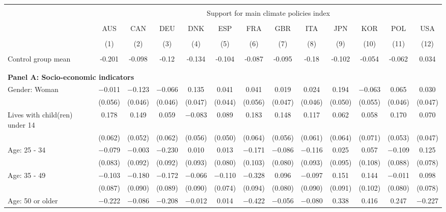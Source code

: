 
\begin{tabular}{@{\extracolsep{5pt}}lcccccccccccc} 
\\[-1.8ex]\hline 
\hline \\[-1.8ex] 
 & \multicolumn{12}{c}{Support for main climate policies index} \\ 
\cline{2-13} 
\\[-1.8ex] & AUS & CAN & DEU & DNK & ESP & FRA & GBR & ITA & JPN & KOR & POL & USA \\ 
\\[-1.8ex] & (1) & (2) & (3) & (4) & (5) & (6) & (7) & (8) & (9) & (10) & (11) & (12)\\ 
\hline \\[-1.8ex] 
Control group mean & -0.201 & -0.098 & -0.12 & -0.134 & -0.104 & -0.087 & -0.095 & -0.18 & -0.102 & -0.054 & -0.062 & 0.034   \\ \hline \\[-1.8ex]
\\[1ex]
\multicolumn{ 13 }{l}{\textbf{ Panel A: Socio-economic indicators }} \\
 Gender: Woman & $-$0.011 & $-$0.123 & $-$0.066 & 0.135 & 0.041 & 0.041 & 0.019 & 0.024 & 0.194 & $-$0.063 & 0.065 & 0.030 \\ 
  & (0.056) & (0.046) & (0.046) & (0.047) & (0.044) & (0.056) & (0.047) & (0.046) & (0.050) & (0.055) & (0.046) & (0.047) \\ 
  Lives with child(ren) under 14 & 0.178 & 0.149 & 0.059 & $-$0.083 & 0.089 & 0.183 & 0.148 & 0.117 & 0.062 & 0.058 & 0.170 & 0.070 \\ 
  & (0.062) & (0.052) & (0.062) & (0.056) & (0.050) & (0.064) & (0.056) & (0.061) & (0.064) & (0.071) & (0.053) & (0.047) \\ 
  Age: 25 - 34 & $-$0.079 & $-$0.003 & $-$0.230 & 0.010 & 0.013 & $-$0.171 & $-$0.086 & $-$0.116 & 0.025 & 0.057 & $-$0.109 & 0.125 \\ 
  & (0.083) & (0.092) & (0.092) & (0.093) & (0.080) & (0.103) & (0.080) & (0.093) & (0.095) & (0.108) & (0.088) & (0.078) \\ 
  Age: 35 - 49 & $-$0.103 & $-$0.180 & $-$0.172 & $-$0.066 & $-$0.110 & $-$0.328 & 0.096 & $-$0.097 & 0.151 & 0.144 & $-$0.011 & 0.098 \\ 
  & (0.087) & (0.090) & (0.089) & (0.090) & (0.074) & (0.094) & (0.080) & (0.090) & (0.091) & (0.102) & (0.080) & (0.078) \\ 
  Age: 50 or older & $-$0.222 & $-$0.086 & $-$0.208 & $-$0.012 & 0.014 & $-$0.422 & $-$0.056 & $-$0.080 & 0.338 & 0.416 & 0.247 & $-$0.227 \\ 

\end{tabular}
